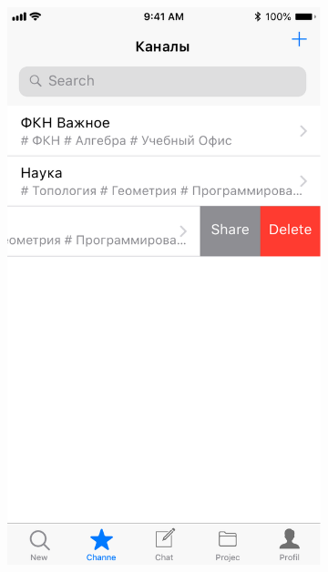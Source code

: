 \documentclass[a4paper,12pt]{article}
\begin{document}
\begin{figure}[h!]
\begin{subfigure}[b]{0.3\linewidth}
			\includegraphics[width=\linewidth]{../includes/prototype/4.pdf}
		\end{subfigure}
		\begin{subfigure}[b]{0.3\linewidth}

\end{subfigure}
\end{figure}
\end{document}
